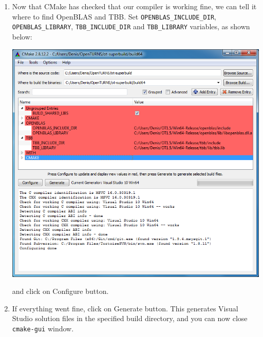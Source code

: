 \begin{enumerate}
\item Now that CMake has checked that our compiler is working fine, we can tell it where to find OpenBLAS and TBB.
Set \texttt{OPENBLAS\_INCLUDE\_DIR}, \texttt{OPENBLAS\_LIBRARY}, \texttt{TBB\_INCLUDE\_DIR} and
\texttt{TBB\_LIBRARY} variables, as shown below:
\begin{center}
  \includegraphics[scale=0.5]{Figures/win_native/cmake-gui-superbuild.png}
\end{center}
and click on \textsf{Configure} button.

\item If everything went fine, click on \textsf{Generate} button.  This generates Visual Studio solution files in the specified
build directory, and you can now close \texttt{cmake-gui} window.


\end{enumerate}
